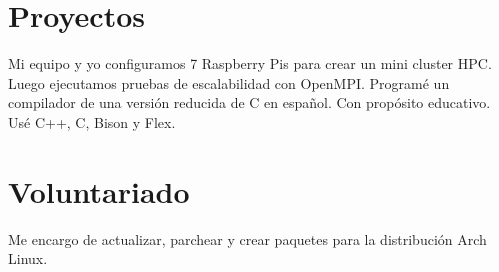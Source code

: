 \documentclass[10pt, a4paper]{moderncv}
\begin{document}
\section{Proyectos}
{
	Mi equipo y yo configuramos 7 Raspberry Pis para crear un mini cluster HPC.
	Luego ejecutamos pruebas de escalabilidad con OpenMPI.
}
{
	Programé un compilador de una versión reducida de C en español.
	Con propósito educativo.
	Usé C++, C, Bison y Flex.
}

\section{Voluntariado}
{
	Me encargo de actualizar, parchear y crear paquetes para la distribución
	Arch Linux.
}

\end{document}
